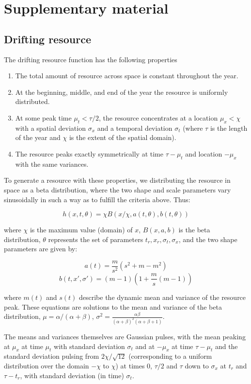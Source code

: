 \documentclass[utf8]{frontiersSCNS} %
\begin{document}
	\clearpage
	\appendix
	
	\section{Supplementary material}
	\normalsize
	
	\subsection{Drifting resource}
	The drifting resource function has the following properties
	
	\begin{enumerate}
		\item The total amount of resource across space is constant throughout the year.
		\item At the beginning, middle, and end of the year the resource is uniformly distributed. 
		\item At some peak time $\mu_t < \tau/2$, the resource concentrates at a location $\mu_x < \chi$ with a spatial deviation $\sigma_x$ and a temporal deviation $\sigma_t$ (where $\tau$ is the length of the year and $\chi$ is the extent of the spatial domain).
		\item The resource peaks exactly symmetrically at time $\tau - \mu_t$ and location $-\mu_x$ with the same variances.
	\end{enumerate}
	
	To generate a resource with these properties, we distributing the resource in space as a beta distribution, where the two shape and scale parameters vary sinusoidally in such a way as to fulfill the criteria above.  Thus:
	
	$$h(x,t, \theta) = \chi B(x/\chi, a(t, \theta), b(t, \theta))$$
	
	where $\chi$ is the maximum value (domain) of $x$, $B(x, a, b)$ is the beta distribution, $\theta$ represents the set of parameters $t_r, x_r, \sigma_t, \sigma_x$, and the two shape parameters are given by:
	
	$$a(t) = \frac{m}{s^2}( s^2 + m - m^2)$$
	$$b(t, x', \sigma') = (m-1)\left(1 + \frac{m}{s}(m-1)\right) $$
	
	where $m(t)$ and $s(t)$ describe the dynamic mean and variance of the resource peak.  These equations are solutions to the mean and variance of the beta distribution, $\mu = \alpha/(\alpha + \beta)$, $\sigma^2 = \frac{\alpha\beta}{(\alpha+\beta)^2(\alpha+\beta+1)}$.
	
	The means and variances themselves are Gaussian pulses, with the mean peaking at $\mu_x$ at time $\mu_t$ with standard deviation $\sigma_t$ and at $-\mu_x$ at time $\tau - \mu_t$ and the standard deviation pulsing from $2 \chi/\sqrt{12}$ (corresponding to a uniform distribution over the domain $-\chi$ to $\chi$) at times 0, $\tau/2$ and $\tau$ down to $\sigma_x$ at $t_r$ and $\tau - t_r$, with standard deviation (in time) $\sigma_t$. 
	
	
\end{document}
